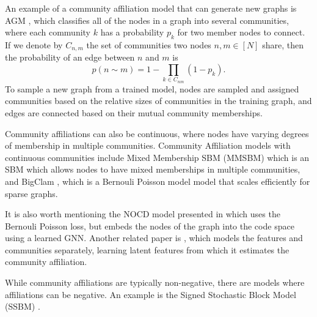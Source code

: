 \documentclass{article}
\theoremstyle{plain}
\theoremstyle{definition}
\newtheorem{definition}[theorem]{Definition}
\theoremstyle{remark}
\begin{document}
An example of a community affiliation model that can generate new graphs is AGM \cite{Overlapping2012}, which classifies all of the nodes in a graph into several communities, where each community $k$ has a probability $p_k$ for two member nodes to connect. If we denote by $C_{n,m}$ the set of communities two nodes $n,m \in [N]$  share, then the probability of an edge between $n$ and $m$ is
\[
p(n\sim m) = 1 - \prod_{k \in C_{nm}} (1 - p_k).
\]
To sample a new graph from a trained model, nodes are sampled and assigned communities based on the relative sizes of communities in the training graph, and edges are connected based on their mutual community memberships.  
 
Community affiliations can also be continuous, where nodes have varying degrees of membership in multiple communities.
Community Affiliation models with continuous communities include Mixed Membership SBM (MMSBM)  \cite{airoldi2008mixed} which is an SBM which allows nodes to have mixed memberships in multiple communities, and BigClam \cite{yang2013BigClam}, which is a Bernouli Poisson model model that scales efficiently for sparse graphs. 


It is also worth mentioning the NOCD model presented in \cite{shchur2019overlapping} which uses the Bernouli Poisson loss, but embeds the nodes of the graph into the code space using a learned GNN. Another related paper is \cite{sun2019vgraph}, which models the features and communities separately, learning latent features from which it estimates the community affiliation. 

While community affiliations are typically non-negative, there are models where affiliations can be negative. An example is the Signed Stochastic Block Model (SSBM) \cite{jiang2015stochastic}.



\end{document}
